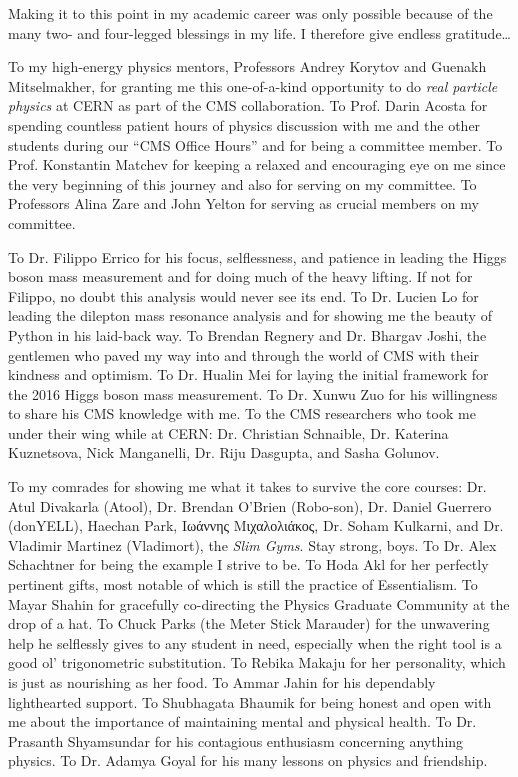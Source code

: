 
Making it to this point in my academic career was only possible because of the many two- and four-legged blessings in my life.
I therefore give endless gratitude\ldots

To my high-energy physics mentors, Professors Andrey Korytov and Guenakh Mitselmakher, for granting me this one-of-a-kind opportunity to do \emph{real particle physics} at CERN as part of the CMS collaboration.
To Prof. Darin Acosta for spending countless patient hours of physics discussion with me and the other students during our ``CMS Office Hours'' and for being a committee member.
To Prof. Konstantin Matchev for keeping a relaxed and encouraging eye on me since the very beginning of this journey and also for serving on my committee.
To Professors Alina Zare and John Yelton for serving as crucial members on my committee.

To Dr. Filippo Errico for his focus, selflessness, and patience in leading the Higgs boson mass measurement and for doing much of the heavy lifting.
If not for Filippo, no doubt this analysis would never see its end.
To Dr. Lucien Lo for leading the dilepton mass resonance analysis and for showing me the beauty of Python in his laid-back way.
To Brendan Regnery and Dr. Bhargav Joshi, the gentlemen who paved my way into and through the world of CMS with their kindness and optimism.
To Dr. Hualin Mei for laying the initial framework for the 2016 Higgs boson mass measurement.
To Dr. Xunwu Zuo for his willingness to share his CMS knowledge with me.
To the CMS researchers who took me under their wing while at CERN: Dr. Christian Schnaible, Dr. Katerina Kuznetsova, Nick Manganelli, Dr. Riju Dasgupta, and Sasha Golunov.

To my comrades for showing me what it takes to survive the core courses: Dr. Atul Divakarla (Atool), Dr. Brendan O'Brien (Robo-son), Dr. Daniel Guerrero (donYELL), Haechan Park, \textgreek{Ιωάννης Μιχαλολιάκος}, Dr. Soham Kulkarni, and Dr. Vladimir Martinez (Vladimort), \ie the \emph{Slim Gyms}. Stay strong, boys.
To Dr. Alex Schachtner for being the example I strive to be.
To Hoda Akl for her perfectly pertinent gifts, most notable of which is still the practice of Essentialism.
To Mayar Shahin for gracefully co-directing the Physics Graduate Community at the drop of a hat.
To Chuck Parks (the Meter Stick Marauder) for the unwavering help he selflessly gives to any student in need, especially when the right tool is a good ol' trigonometric substitution.
To Rebika Makaju for her personality, which is just as nourishing as her food.
To Ammar Jahin for his dependably lighthearted support.
To Shubhagata Bhaumik for being honest and open with me about the importance of maintaining mental and physical health.
To Dr. Prasanth Shyamsundar for his contagious enthusiasm concerning anything physics.
To Dr. Adamya Goyal for his many lessons on physics and friendship.

